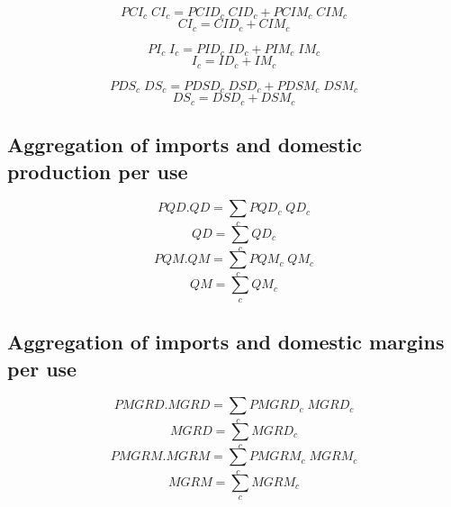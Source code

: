 \documentclass[12pt]{article}
\numberwithin{equation}{section}
\begin{document}
\begin{dmath}
PCI_{c} \; CI_{c} = PCID_{c} \; CID_{c} + PCIM_{c} \; CIM_{c}
\end{dmath}
\begin{dmath}
CI_{c} = CID_{c} + CIM_{c}
\end{dmath}

\begin{dmath}
PI_{c} \; I_{c} = PID_{c} \; ID_{c} + PIM_{c} \; IM_{c}
\end{dmath}
\begin{dmath}
I_{c} = ID_{c} + IM_{c}
\end{dmath}

\begin{dmath}
PDS_{c} \; DS_{c} = PDSD_{c} \; DSD_{c} + PDSM_{c} \; DSM_{c}
\end{dmath}
\begin{dmath}
DS_{c} = DSD_{c} + DSM_{c}
\end{dmath}



\subsection{Aggregation of imports and domestic production per use}



\begin{dmath}
PQD . QD = \sum_{c} PQD_{c} \; QD_{c}
\end{dmath}
\begin{dmath}
QD = \sum_{c} QD_{c}
\end{dmath}
\begin{dmath}
PQM . QM = \sum_{c} PQM_{c} \; QM_{c}
\end{dmath}
\begin{dmath}
QM = \sum_{c} QM_{c}
\end{dmath}



\subsection{Aggregation of imports and domestic margins per use}



\begin{dmath}
PMGRD . MGRD = \sum_{c} PMGRD_{c} \; MGRD_{c}
\end{dmath}
\begin{dmath}
MGRD = \sum_{c} MGRD_{c}
\end{dmath}
\begin{dmath}
PMGRM . MGRM = \sum_{c} PMGRM_{c} \; MGRM_{c}
\end{dmath}
\begin{dmath}
MGRM = \sum_{c} MGRM_{c}
\end{dmath}
\end{document}

